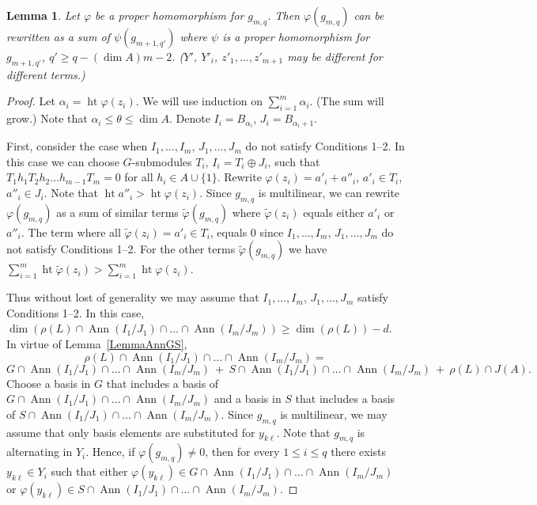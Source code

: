 \documentclass[12pt, reqno, a4paper]{amsart}
\theoremstyle{plain}
\newtheorem{lemma}{Lemma}
\theoremstyle{remark}
\theoremstyle{definition}
\begin{document}
\begin{lemma}\label{LemmaReduct}
Let $\varphi$ be a \textit{proper} homomorphism for $g_{m,q}$.
Then $\varphi(g_{m,q})$ can be rewritten as a
sum of $\psi(g_{m+1,q'})$ where $\psi$
is a proper homomorphism for $g_{m+1,q'}$, $q' \geqslant q - (\dim A)m - 2$.
  ($Y'$, $Y'_i$, $z'_1, \ldots, z'_{m+1}$ may be different
for different terms.)
\end{lemma}
\begin{proof}
Let $\alpha_i = \operatorname{ht} \varphi(z_i)$.
We will use induction on $\sum_{i=1}^m \alpha_i$.
(The sum will grow.)
 Note that $ \alpha_i \leqslant \theta \leqslant \dim A$.
Denote $I_i = B_{\alpha_i}$, $J_i = B_{\alpha_{i}+1}$.

First, consider the case when $I_1, \ldots, I_m$,
$J_1, \ldots, J_m$ do not satisfy Conditions 1--2.
In this case we can choose $G$-submodules
$T_i$, $I_i = T_i \oplus J_i$, such that
$T_1 h_1 T_2 h_2 \ldots h_{m-1} T_m = 0$
for all $h_i \in A \cup \lbrace 1 \rbrace$.
Rewrite $\varphi(z_i)=a'_i+a''_i$, $a'_i \in T_i$, $a''_i \in J_i$.
Note that $\operatorname{ht} a''_i > \operatorname{ht} \varphi(z_i)$.
Since $g_{m,q}$ is multilinear, we can rewrite
$\varphi(g_{m,q})$ as a sum of similar
terms $\tilde\varphi(g_{m,q})$ where $\tilde\varphi(z_i)$ equals either
$a'_i$ or $a''_i$. The term where all
$\tilde\varphi(z_i)=a'_i \in T_i$, equals $0$ since
$I_1, \ldots, I_m$,
$J_1, \ldots, J_m$ do not satisfy Conditions 1--2.
For the other terms $\tilde\varphi(g_{m,q})$ we
have $\sum_{i=1}^m \operatorname{ht} \tilde\varphi(z_i) > \sum_{i=1}^m \operatorname{ht} \varphi(z_i)$.

Thus without lost of generality
we may assume that $I_1, \ldots, I_m$,
$J_1, \ldots, J_m$ satisfy Conditions 1--2.
In this case, $\dim(\rho(L) \cap \operatorname{Ann}(I_1/J_1) \cap \ldots \cap \operatorname{Ann}(I_m/J_m))
\geqslant \dim(\rho(L))-d$.
In virtue of Lemma~\ref{LemmaAnnGS},
$$\rho(L) \cap \operatorname{Ann}(I_1/J_1) \cap \ldots \cap \operatorname{Ann}(I_m/J_m)
= $$ $$G \cap \operatorname{Ann}(I_1/J_1) \cap \ldots \cap \operatorname{Ann}(I_m/J_m)\
+\ S \cap \operatorname{Ann}(I_1/J_1) \cap \ldots \cap \operatorname{Ann}(I_m/J_m)\ +\ \rho(L) \cap J(A).$$
Choose a basis in $G$ that includes a basis of $G \cap \operatorname{Ann}(I_1/J_1) \cap \ldots \cap \operatorname{Ann}(I_m/J_m)$ and a basis in $S$ that includes a basis of $S \cap \operatorname{Ann}(I_1/J_1) \cap \ldots \cap \operatorname{Ann}(I_m/J_m)$. Since $g_{m,q}$ is multilinear, we may assume
that only basis elements are substituted for $y_{k\ell}$. Note that $g_{m,q}$
is alternating in $Y_i$. Hence, if $\varphi(g_{m,q})\ne 0$, then for every $1 \leqslant i \leqslant q$
there exists $y_{k\ell} \in Y_i$ such that
either $\varphi(y_{k\ell}) \in G \cap \operatorname{Ann}(I_1/J_1) \cap \ldots \cap \operatorname{Ann}(I_m/J_m)$
or $\varphi(y_{k\ell}) \in S \cap \operatorname{Ann}(I_1/J_1) \cap \ldots \cap \operatorname{Ann}(I_m/J_m)$.


\end{proof}
\end{document}
